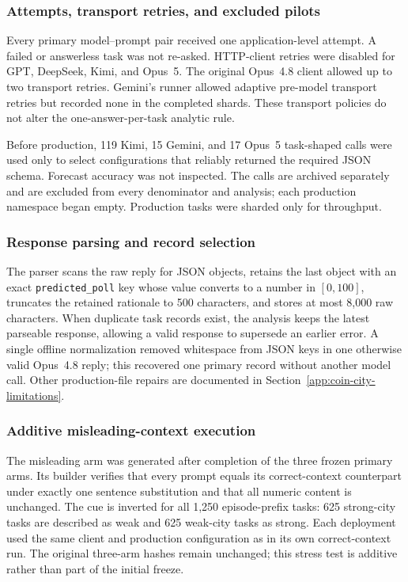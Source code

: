 \subsubsection{Attempts, transport retries, and excluded pilots}
Every primary model--prompt pair received one application-level attempt. A failed
or answerless task was not re-asked. HTTP-client retries were disabled for GPT,
DeepSeek, Kimi, and Opus~5. The original Opus~4.8 client allowed up to two
transport retries. Gemini's runner allowed adaptive pre-model transport retries
but recorded none in the completed shards. These transport policies do not alter
the one-answer-per-task analytic rule.

Before production, 119 Kimi, 15 Gemini, and 17 Opus~5 task-shaped calls were used
only to select configurations that reliably returned the required JSON schema.
Forecast accuracy was not inspected. The calls are archived separately and are
excluded from every denominator and analysis; each production namespace began
empty. Production tasks were sharded only for throughput.

\subsubsection{Response parsing and record selection}
The parser scans the raw reply for JSON objects, retains the last object with an
exact \texttt{predicted\_poll} key whose value converts to a number in
\([0,100]\), truncates the retained rationale to 500 characters, and stores at
most 8,000 raw characters. When duplicate task records exist, the analysis keeps
the latest parseable response, allowing a valid response to supersede an earlier
error. A single offline normalization removed whitespace from JSON keys in one
otherwise valid Opus~4.8 reply; this recovered one primary record without another
model call. Other production-file repairs are documented in
Section~\ref{app:coin-city-limitations}.

\subsubsection{Additive misleading-context execution}
The misleading arm was generated after completion of the three frozen primary
arms. Its builder verifies that every prompt equals its correct-context counterpart
under exactly one sentence substitution and that all numeric content is unchanged.
The cue is inverted for all 1,250 episode-prefix tasks: 625 strong-city tasks are
described as weak and 625 weak-city tasks as strong. Each deployment used the same
client and production configuration as in its own correct-context run. The
original three-arm hashes remain unchanged; this stress test is additive rather
than part of the initial freeze.

